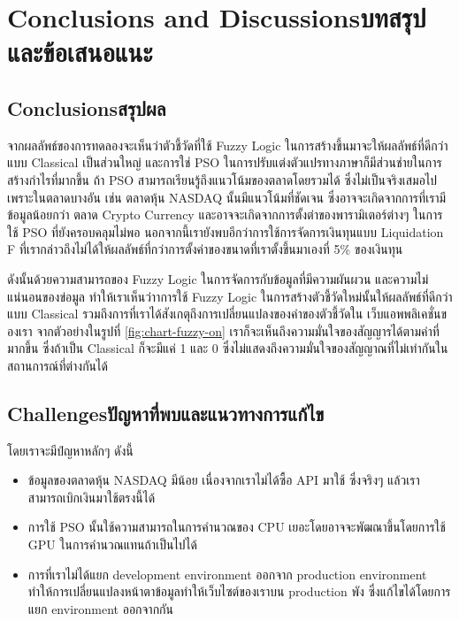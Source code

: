 \chapter{\ifenglish Conclusions and Discussions\else บทสรุปและข้อเสนอแนะ\fi}

\section{\ifenglish Conclusions\else สรุปผล\fi}


จากผลลัพธ์ของการทดลองจะเห็นว่าตัวชี้วัดที่ใช้ Fuzzy Logic ในการสร้างขึ้นมาจะให้ผลลัพธ์ที่ดีกว่าแบบ Classical เป็นส่วนใหญ่ และการใช่ PSO ในการปรับแต่งตัวแปรทางภาษาก็มีส่วนช่ายในการสร้างกำไรที่มากขึ้น ถ้า PSO สามารถเรียนรู้ถึงแนวโน้มของตลาดโดยรวมได้ ซึ่งไม่เป็นจริงเสมอไป เพราะในตลาดบางอัน เช่น ตลาดหุ้น NASDAQ นั้นมีแนวโน้มที่ชัดเจน ซึ่งอาจจะเกิดจากการที่เรามีข้อมูลน้อยกว่า ตลาด Crypto Currency และอาจจะเกิดจากการตั้งต่าของพารามิเตอร์ต่างๆ ในการใช้ PSO ที่ยังครอบคลุมไม่พอ นอกจากนี้เรายังพบอีกว่าการใช้การจัดการเงินทุนแบบ Liquidation F ที่เรากล่าวถึงไม่ได้ให้ผลลัพธ์ที่กว่าการตั้งค่าของขนาดที่เราตั้งขึ้นมาเองที่ 5\% ของเงินทุน 

ดังนั้นด้วยความสามารถของ Fuzzy Logic ในการจัดการกับข้อมูลที่มีความผันผวน และความไม่แน่นอนของข่อมูล ทำให้เราเห็นว่าาการใช้ Fuzzy
Logic ในการสร้างตัวชี้วัดใหม่นั้นให้ผลลัพธ์ที่ดีกว่าแบบ Classical รวมถึงการที่เราได้สังเกตุถึงการเปลี่ยนแปลงของค่าของตัวชี้วัดใน เว็บแอพพลิเคชั่นของเรา จากตัวอย่างในรูปที่ \ref{fig:chart-fuzzy-on} เราก็จะเห็นถึงความมั่นใจของสัญญารได้ตามค่าที่มากขึ้น ซึ่งถ้าเป็น Classical ก็จะมีแค่ 1 และ 0 ซึ่งไม่แสดงถึงความมั่นใจของสัญญาณที่ไม่เท่ากันในสถานการณ์ที่ต่างกันได้

\section{\ifenglish Challenges\else ปัญหาที่พบและแนวทางการแก้ไข\fi}
โดยเราจะมีปํญหาหลักๆ ดังนี้
\begin{itemize}
    \item ข้อมูลของตลาดหุ้น NASDAQ มีน้อย เนื่องจากเราไม่ได้ซื้อ API มาใช้ ซึ่งจริงๆ แล้วเราสามารถเบิกเงินมาใช้ตรงนี้ได้
    \item การใช้ PSO นั้นใช้ความสามารถในการคำนวณของ CPU เยอะโดยอาจจะพัฒณาขึ้นโดยการใช้ GPU ในการคำนวณแทนถ้าเป็นไปได้
    \item การที่เราไม่ได้แยก development environment ออกจาก production environment ทำให้การเปลี่ยนแปลงหน้าตาข้อมูลทำให้เว็บไซต์ของเราบน production พัง ซึ่งแก้ไขได้โดยการแยก environment ออกจากกัน
\end{itemize}

